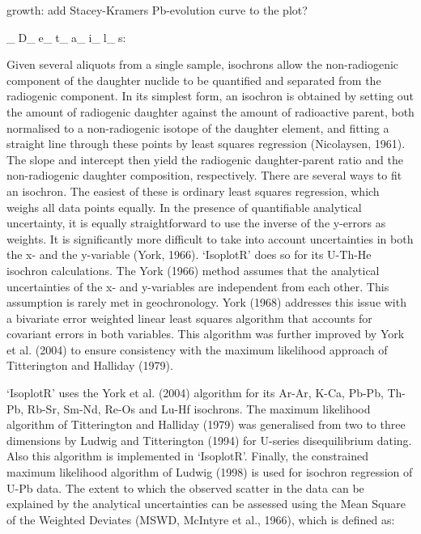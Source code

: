   growth: add Stacey-Kramers Pb-evolution curve to the plot?

_D_e_t_a_i_l_s:

     Given several aliquots from a single sample, isochrons allow the
     non-radiogenic component of the daughter nuclide to be quantified
     and separated from the radiogenic component. In its simplest form,
     an isochron is obtained by setting out the amount of radiogenic
     daughter against the amount of radioactive parent, both normalised
     to a non-radiogenic isotope of the daughter element, and fitting a
     straight line through these points by least squares regression
     (Nicolaysen, 1961). The slope and intercept then yield the
     radiogenic daughter-parent ratio and the non-radiogenic daughter
     composition, respectively. There are several ways to fit an
     isochron.  The easiest of these is ordinary least squares
     regression, which weighs all data points equally. In the presence
     of quantifiable analytical uncertainty, it is equally
     straightforward to use the inverse of the y-errors as weights.  It
     is significantly more difficult to take into account uncertainties
     in both the x- and the y-variable (York, 1966). ‘IsoplotR’ does so
     for its U-Th-He isochron calculations. The York (1966) method
     assumes that the analytical uncertainties of the x- and
     y-variables are independent from each other. This assumption is
     rarely met in geochronology.  York (1968) addresses this issue
     with a bivariate error weighted linear least squares algorithm
     that accounts for covariant errors in both variables. This
     algorithm was further improved by York et al. (2004) to ensure
     consistency with the maximum likelihood approach of Titterington
     and Halliday (1979).

     ‘IsoplotR’ uses the York et al. (2004) algorithm for its Ar-Ar,
     K-Ca, Pb-Pb, Th-Pb, Rb-Sr, Sm-Nd, Re-Os and Lu-Hf isochrons. The
     maximum likelihood algorithm of Titterington and Halliday (1979)
     was generalised from two to three dimensions by Ludwig and
     Titterington (1994) for U-series disequilibrium dating. Also this
     algorithm is implemented in ‘IsoplotR’. Finally, the constrained
     maximum likelihood algorithm of Ludwig (1998) is used for isochron
     regression of U-Pb data. The extent to which the observed scatter
     in the data can be explained by the analytical uncertainties can
     be assessed using the Mean Square of the Weighted Deviates (MSWD,
     McIntyre et al., 1966), which is defined as:

